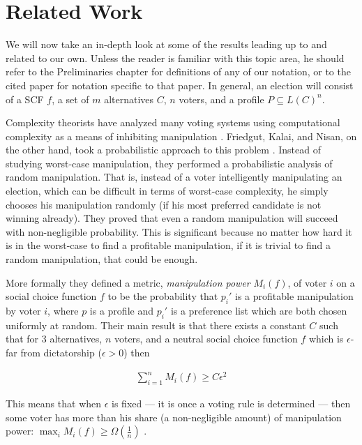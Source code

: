 
\chapter{Related Work}

	We will now take an in-depth look at some of the results leading up to and related to our own. Unless the reader is familiar with this topic area, he should refer to the Preliminaries chapter for definitions of any of our notation, or to the cited paper for notation specific to that paper. In general, an election will consist of a SCF $f$, a set of $m$ alternatives $C$, $n$ voters, and a profile $P \subseteq L(C)^n$.

	Complexity theorists have analyzed many voting systems using computational complexity as a means of inhibiting manipulation \cite{bartholdi1989computational, hemaspaandra2009hybrid}. Friedgut, Kalai, and Nisan, on the other hand, took a probabilistic approach to this problem \cite{friedgut2008elections}. Instead of studying worst-case manipulation, they performed a probabilistic analysis of random manipulation. That is, instead of a voter intelligently manipulating an election, which can be difficult in terms of worst-case complexity, he simply chooses his manipulation randomly (if his most preferred candidate is not winning already). They proved that even a random manipulation will succeed with non-negligible probability. This is significant because no matter how hard it is in the worst-case to find a profitable manipulation, if it is trivial to find a random manipulation, that could be enough.

	More formally they defined a metric, \emph{manipulation power} $M_i(f)$, of voter $i$ on a social choice function $f$ to be the probability that $p_i'$ is a profitable manipulation by voter $i$, where $p$ is a profile and $p_i'$ is a preference list which are both chosen uniformly at random. Their main result is that there exists a constant $C$ such that for 3 alternatives, $n$ voters, and a neutral social choice function $f$ which is $\epsilon$-far from dictatorship ($\epsilon > 0$) then

	\begin{align*}
		\sum_{i=1}^n M_i(f) \ge C \epsilon^2
	\end{align*}

	This means that when $\epsilon$ is fixed --- it is once a voting rule is determined --- then some voter has more than his share (a non-negligible amount) of manipulation power: $\max_i M_i(f) \ge \Omega(\frac{1}{n})$ \cite{friedgut2008elections}.

